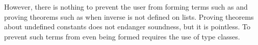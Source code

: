 \begin{isabellebody}
\begin{isamarkuptext}
However, there is nothing to prevent the user from forming terms such as
 and proving theorems such as  when inverse is not defined on lists.  Proving theorems about
undefined constants does not endanger soundness, but it is pointless.
To prevent such terms from even being formed requires the use of type classes.%
\end{isamarkuptext}%
\end{isabellebody}%
